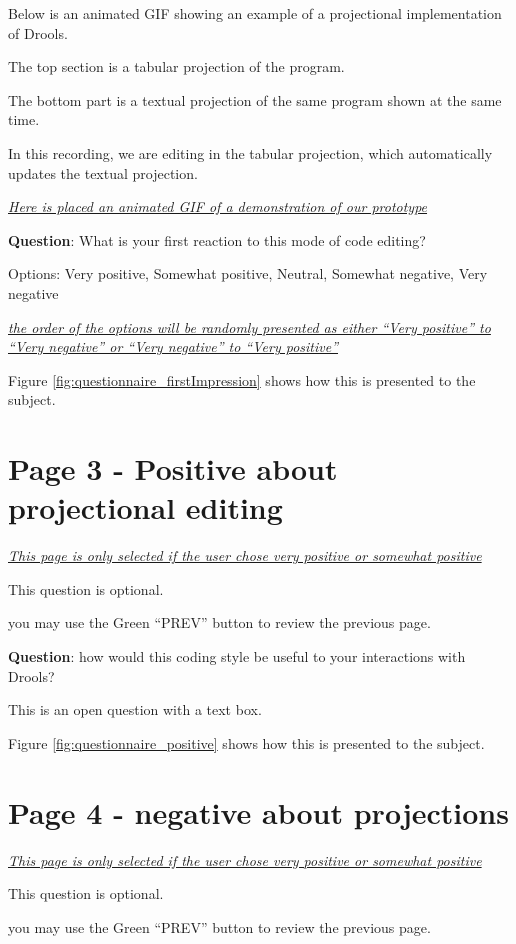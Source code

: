 Below is an animated GIF showing an example of a projectional implementation of Drools.

The top section is a tabular projection of the program.

The bottom part is a textual projection of the same program shown at the same time.

In this recording, we are editing in the tabular projection, which automatically updates the textual projection.

\emph{\underline{Here is placed an animated GIF of a demonstration of our prototype}}

\textbf{Question}: What is your first reaction to this mode of code editing?

Options: Very positive, Somewhat positive, Neutral, Somewhat negative, Very negative 

\emph{\underline{the order of the options will be randomly presented as either ``Very positive'' to ``Very negative'' or ``Very negative'' to ``Very positive''}}

Figure \ref{fig:questionnaire_firstImpression} shows how this is presented to the subject.

\section*{Page 3 - Positive about projectional editing}

\emph{\underline{This page is only selected if the user chose very positive or somewhat positive}}

This question is optional.

you may use the Green ``PREV'' button to review the previous page.

\textbf{Question}: how would this coding style be useful to your interactions with Drools?

This is an open question with a text box.

Figure \ref{fig:questionnaire_positive} shows how this is presented to the subject.

\section*{Page 4 - negative about projections}

\emph{\underline{This page is only selected if the user chose very positive or somewhat positive}}

This question is optional.

you may use the Green ``PREV'' button to review the previous page.

